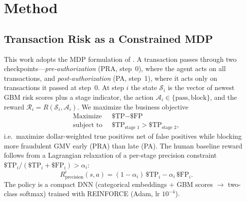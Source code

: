 \documentclass[11pt]{article}
\begin{document}
\section{Method}

\subsection{Transaction Risk as a Constrained MDP}
This work adopts the MDP formulation of \citet{qu2025llmenhanced}. A transaction passes through two
checkpoints---\emph{pre-authorization} (PRA, step~0), where the agent acts on all
transactions, and \emph{post-authorization} (PA, step~1), where it acts only on
transactions it passed at step~0. At step $i$ the state $\mathcal{S}_i$ is the vector of
newest GBM risk scores plus a stage indicator, the action $\mathcal{A}_i \in
\{\text{pass},\text{block}\}$, and the reward $\mathcal{R}_i = R(\mathcal{S}_i,
\mathcal{A}_i)$. We maximize the business objective
\begin{align}
\label{equ:opt_target}
\text{Maximize } & \; \text{\$TP} - \text{\$FP} \\
\text{subject to } & \; \text{\$TP}_{\text{stage 1}} > \text{\$TP}_{\text{stage 2}}, \nonumber
\end{align}
i.e.\ maximize dollar-weighted true positives net of false positives while blocking more
fraudulent GMV early (PRA) than late (PA). The human baseline reward follows from a
Lagrangian relaxation of a per-stage precision constraint $\text{\$TP}_i / (\text{\$TP}_i
+ \text{\$FP}_i) > \alpha_i$:
\begin{equation}
\label{equ:rw_1}
R_{\text{precision}}^{i}(s,a) = (1-\alpha_i)\,\text{\$TP}_i - \alpha_i\,\text{\$FP}_i .
\end{equation}
The policy is a compact DNN (categorical embeddings $+$ GBM scores $\rightarrow$ two-class
softmax) trained with REINFORCE \cite{williams1992simple} (Adam, lr $10^{-4}$).
\end{document}
